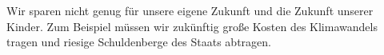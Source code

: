 Wir sparen nicht genug für unsere eigene Zukunft und die Zukunft unserer Kinder.
Zum Beispiel müssen wir zukünftig große Kosten des Klimawandels tragen und riesige Schuldenberge des Staats abtragen.